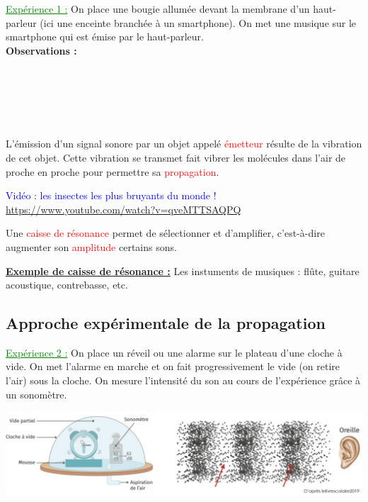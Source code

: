 \textcolor{green}{\underline{Expérience 1 :}} On place une bougie allumée devant la membrane d'un haut-parleur (ici une enceinte branchée à un smartphone). On met une musique sur le smartphone qui est émise par le haut-parleur.\\
\textbf{Observations :} \\
\\
\\
\\
\\
\\

\begin{tcolorbox}[colback=red!5!white,colframe=red!75!black,title=\textbf{Propriété de l'émission d'un son : }, upperbox=invisible]
L'émission d'un signal sonore par un objet appelé \textcolor{red}{émetteur} résulte de la vibration de cet objet. Cette vibration se transmet fait vibrer les molécules dans l'air de proche en proche pour permettre sa \textcolor{red}{propagation}.
\end{tcolorbox}

\textcolor{blue}{Vidéo : les insectes les plus bruyants du monde !} \url{https://www.youtube.com/watch?v=qveMTTSAQPQ}
\begin{tcolorbox}[colback=red!5!white,colframe=red!75!black,title=\textbf{Caisse de résonance : }, upperbox=invisible]
Une \textcolor{red}{caisse de résonance} permet de sélectionner et d'amplifier, c'est-à-dire augmenter son \textcolor{red}{amplitude} certains sons.
\end{tcolorbox}

\textbf{\underline{Exemple de caisse de résonance :}} Les instuments de musiques : flûte, guitare acoustique, contrebasse, etc.


\subsection{Approche expérimentale de la propagation}
\textcolor{green}{\underline{Expérience 2 :}} On place un réveil ou une alarme sur le plateau d'une cloche à vide. On met l'alarme en marche et on fait progressivement le vide (on retire l'air) sous la cloche. On mesure l'intensité du son au cours de l'expérience grâce à un sonomètre.
\begin{center}
    \includegraphics[scale=0.57]{Images/Propagation_exp.png}
\end{center}

